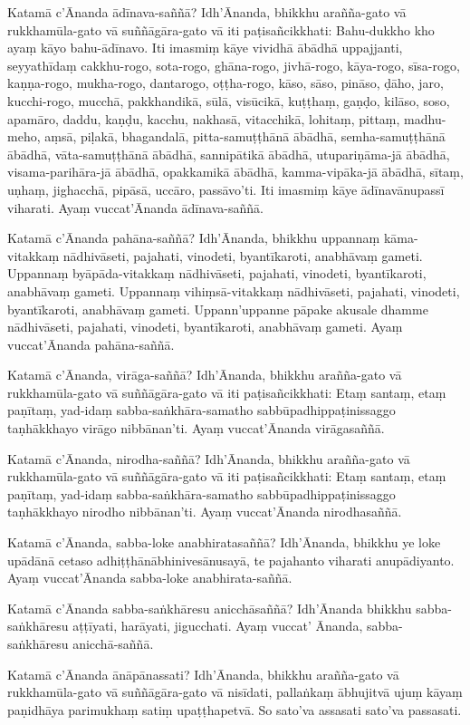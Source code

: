 Katamā c’Ānanda ādīnava-saññā? Idh’Ānanda, bhikkhu arañña-gato vā
rukkhamūla-gato vā suññāgāra-gato vā iti paṭisañcikkhati: Bahu-dukkho kho ayaṃ
kāyo bahu-ādīnavo. Iti imasmiṃ kāye vividhā ābādhā uppajjanti, seyyathīdaṃ
cakkhu-rogo, sota-rogo, ghāna-rogo, jivhā-rogo, kāya-rogo, sīsa-rogo,
kaṇṇa-rogo, mukha-rogo, dantarogo, oṭṭha-rogo, kāso, sāso, pināso, ḍāho, jaro,
kucchi-rogo, mucchā, pakkhandikā, sūlā, visūcikā, kuṭṭhaṃ, gaṇḍo, kilāso, soso,
apamāro, daddu, kaṇḍu, kacchu, nakhasā, vitacchikā, lohitaṃ, pittaṃ, madhu-meho,
aṃsā, piḷakā, bhagandalā, pitta-samuṭṭhānā ābādhā, semha-samuṭṭhānā ābādhā,
vāta-samuṭṭhānā ābādhā, sannipātikā ābādhā, utupariṇāma-jā ābādhā,
visama-parihāra-jā ābādhā, opakkamikā ābādhā, kamma-vipāka-jā ābādhā, sītaṃ,
uṇhaṃ, jighacchā, pipāsā, uccāro, passāvo’ti. Iti imasmiṃ kāye ādīnavānupassī
viharati. Ayaṃ vuccat’Ānanda ādīnava-saññā.

\ifhandbookedition
\enlargethispage{\baselineskip}
\fi

Katamā c’Ānanda pahāna-saññā? Idh’Ānanda, bhikkhu uppannaṃ kāma-vitakkaṃ
nādhivāseti, pajahati, vinodeti, byantīkaroti, anabhāvaṃ gameti. Uppannaṃ
byāpāda-vitakkaṃ nādhivāseti, pajahati, vinodeti, byantīkaroti, anabhāvaṃ
gameti. Uppannaṃ vihiṃsā-vitakkaṃ nādhivāseti, pajahati, vinodeti, byantīkaroti,
anabhāvaṃ gameti. Uppann’uppanne pāpake akusale dhamme nādhivāseti, pajahati,
vinodeti, byantīkaroti, anabhāvaṃ gameti. Ayaṃ vuccat’Ānanda pahāna-saññā.

Katamā c’Ānanda, virāga-saññā? Idh’Ānanda, bhikkhu arañña-gato vā
rukkhamūla-gato vā suññāgāra-gato vā iti paṭisañcikkhati: Etaṃ santaṃ, etaṃ
paṇītaṃ, yad-idaṃ sabba-saṅkhāra-samatho sabbūpadhippaṭinissaggo taṇhākkhayo
virāgo nibbānan’ti. Ayaṃ vuccat’Ānanda virāgasaññā.

Katamā c’Ānanda, nirodha-saññā? Idh’Ānanda, bhikkhu arañña-gato vā
rukkhamūla-gato vā suññāgāra-gato vā iti paṭisañcikkhati: Etaṃ santaṃ, etaṃ
paṇītaṃ, yad-idaṃ sabba-saṅkhāra-samatho sabbūpadhippaṭinissaggo taṇhākkhayo
nirodho nibbānan’ti. Ayaṃ vuccat’Ānanda nirodhasaññā.

Katamā c’Ānanda, sabba-loke anabhiratasaññā? Idh’Ānanda, bhikkhu ye loke
upādānā cetaso adhiṭṭhānābhinivesānusayā, te pajahanto viharati anupādiyanto.
Ayaṃ vuccat’Ānanda sabba-loke anabhirata-saññā.

Katamā c’Ānanda sabba-saṅkhāresu anicchāsaññā? Idh’Ānanda bhikkhu
sabba-saṅkhāresu aṭṭīyati, harāyati, jigucchati. Ayaṃ vuccat’ Ānanda,
sabba-saṅkhāresu anicchā-saññā.

Katamā c’Ānanda ānāpānassati?
Idh’Ānanda, bhikkhu arañña-gato vā rukkhamūla-gato vā suññāgāra-gato vā nisīdati,
pallaṅkaṃ ābhujitvā ujuṃ kāyaṃ paṇidhāya parimukhaṃ satiṃ upaṭṭhapetvā. So sato’va
assasati sato’va passasati.

